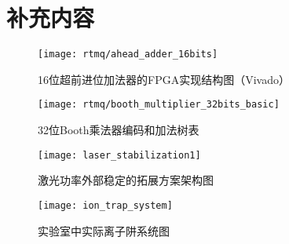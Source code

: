 
\chapter{补充内容}



\begin{figure}
    \centering
    \caption[16位超前进位加法器的FPGA实现结构图]{16位超前进位加法器的FPGA实现结构图（Vivado）\label{fig:ahead_adder_16bits}}
    \texttt{[image: rtmq/ahead\_adder\_16bits]}
\end{figure}


\begin{figure}
    \centering
    \caption[32位Booth乘法器编码和加法树表]{32位Booth乘法器编码和加法树表\label{fig:booth_multiplier_32bits_basic}}
    \texttt{[image: rtmq/booth\_multiplier\_32bits\_basic]}
\end{figure}




\begin{figure}
    \centering
    \caption[激光功率外部稳定的拓展方案架构图]{激光功率外部稳定的拓展方案架构图\label{fig:laser_stabilization}}
    \texttt{[image: laser\_stabilization1]}
\end{figure}

\begin{figure}
    \centering
    \caption[实验室中实际离子阱系统图]{实验室中实际离子阱系统图\label{fig:ion_trap_system}}
    \texttt{[image: ion\_trap\_system]}
\end{figure}